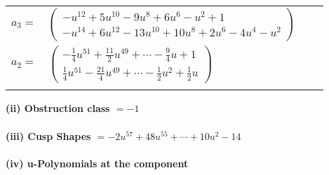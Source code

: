 \documentclass[1p]{elsarticle_modified}
\theoremstyle{definition}
\begin{document}
\begin{tabular}{m{7pt} m{180pt} m{7pt} m{180pt} }
\flushright $a_{3}=$&$\begin{pmatrix}- u^{12}+5 u^{10}-9 u^8+6 u^6- u^2+1\\- u^{14}+6 u^{12}-13 u^{10}+10 u^8+2 u^6-4 u^4- u^2\end{pmatrix}$ \\
\flushright $a_{2}=$&$\begin{pmatrix}-\frac{1}{4} u^{51}+\frac{11}{2} u^{49}+\cdots-\frac{9}{4} u+1\\\frac{1}{4} u^{51}-\frac{21}{4} u^{49}+\cdots-\frac{1}{2} u^2+\frac{1}{2} u\end{pmatrix}$\\&\end{tabular}
\flushleft \textbf{(ii) Obstruction class $= -1$}\\~\\
\flushleft \textbf{(iii) Cusp Shapes $= -2 u^{57}+48 u^{55}+\cdots+10 u^2-14$}\\~\\
\newpage\renewcommand{\arraystretch}{1}
\flushleft \textbf{(iv) u-Polynomials at the component}\newline \\
\end{document}
